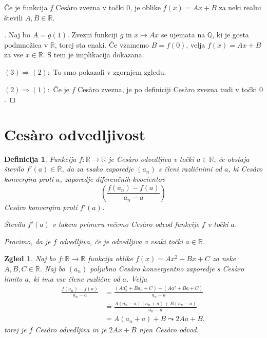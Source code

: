 \documentclass[10]{beamer}
\newtheorem{definicija}{Definicija}
\newtheorem{zgled}{Zgled}
\newenvironment{dokaz}{\begin{proof}[\bfseries\upshape\proofname]}{\end{proof}}
\begin{document}
\begin{frame}
    \begin{block}{}
        Če je funkcija $f$ Ces\`{a}ro zvezna v točki $0$, je oblike $f(x) = Ax + B$ za neki realni števili $A, B \in \mathbb{R}$.
    \end{block}
    \begin{dokaz}
        Naj bo $A = g(1)$. Zvezni funkciji $g$ in $x \mapsto Ax$ se ujemata na $\mathbb{Q}$, ki je gosta podmnožica v $\mathbb{R}$, torej sta enaki. Če vzamemo $B = f(0)$, velja $f(x) = Ax + B$ za vse $x \in \mathbb{R}$. S tem je implikacija dokazana.
        \pause

        \medskip
        $(3) \Rightarrow (2): $ To smo pokazali v zgornjem zgledu.
        \pause

        \medskip
        $(2) \Rightarrow (1): $ Če je $f$ Ces\`{a}ro zvezna, je po definiciji Ces\`{a}ro zvezna tudi v točki $0$.
    \end{dokaz}
\end{frame}


\section{Ces\`{a}ro odvedljivost}

\begin{frame}
    \begin{definicija}
        Funkcija $f: \mathbb{R} \rightarrow \mathbb{R}$ je Ces\`{a}ro odvedljiva v točki $a \in \mathbb{R}$, če obstaja število $f'(a) \in \mathbb{R}$, da za vsako zaporedje $(a_n)$ s členi različnimi od $a$, ki Ces\`{a}ro konvergira proti $a$, zaporedje diferenčnih kvocientov 
        $$(\frac{f(a_n)-f(a)}{a_n-a})$$ 
        Ces\`{a}ro konvergira proti $f'(a)$. 
        \pause

        \medskip
        Številu $f'(a)$ v takem primeru rečemo Ces\`{a}ro odvod funkcije $f$ v točki $a$. 
        \pause

        \medskip
        Pravimo, da je $f$ odvedljiva, če je odvedljiva v vsaki točki $a \in \mathbb{R}$.
    \end{definicija}
\end{frame}

\begin{frame}
    \begin{zgled}
        \label{vseodv}
        Naj bo $f: \mathbb{R} \rightarrow \mathbb{R}$ funkcija oblike $f(x) = Ax^2 + Bx + C$ za neke $A, B, C \in \mathbb{R}$. Naj bo $(a_n)$ poljubno Ces\`{a}ro konvergentno zaporedje s Ces\`{a}ro limito $a$, ki ima vse člene različne od $a$. Velja 
        \begin{align*}
            \frac{f(a_n)-f(a)}{a_n-a} &= \frac{(Aa_n^2 + Ba_n + C)-(Aa^2 + Ba + C)}{a_n-a}\\
            &= \frac{A(a_n-a)(a_n+a) + B(a_n-a)}{a_n-a}\\
            &= A(a_n+a) + B \leadsto 2Aa + B,
        \end{align*}
        torej je $f$ Ces\`{a}ro odvedljiva in je $2Ax + B$ njen Ces\`{a}ro odvod.
    \end{zgled}
\end{frame}
\end{document}

